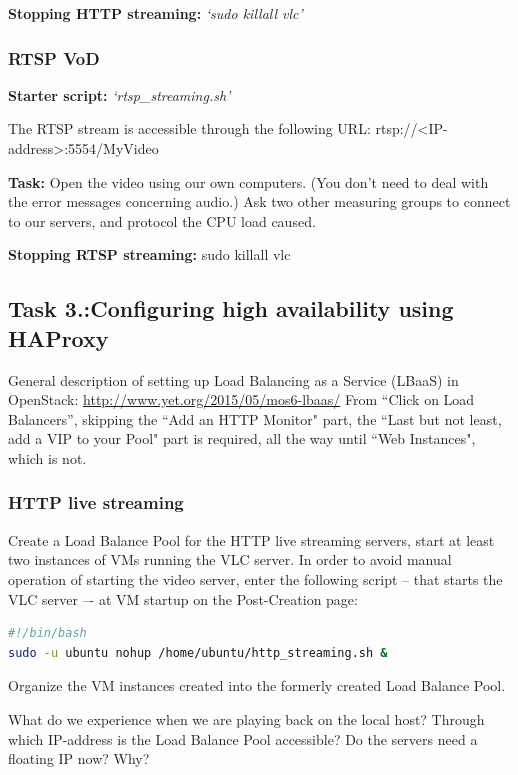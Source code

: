\documentclass[a4paper]{article}
\begin{document}
\noindent{}\textbf{Stopping HTTP streaming:} \emph{`sudo killall vlc'}

\subsubsection{RTSP VoD}
\textbf{Starter script:}  \emph{`rtsp\_streaming.sh'}

\noindent{}The RTSP stream is accessible through the following URL: rtsp://{}\textless{}IP-address{}\textgreater{}:5554/MyVideo

\noindent{}\textbf{Task:} Open the video using our own computers. (You don't need to deal with the error messages concerning audio.)
Ask two other measuring groups to connect to our servers, and protocol the CPU load caused.

\noindent{}\textbf{Stopping RTSP streaming:} sudo killall vlc

\subsection{Task 3.:Configuring high availability using HAProxy}

General description of setting up Load Balancing as a Service (LBaaS) in OpenStack:
\url{http://www.yet.org/2015/05/mos6-lbaas/}
From “Click on Load Balancers”, skipping the ``Add an HTTP Monitor" part, the ``Last but not least, add a VIP to your Pool" part is required, all the way until ``Web Instances", which is not.

\subsubsection{HTTP live streaming}

Create a Load Balance Pool for the HTTP live streaming servers, start at least two instances of VMs running the VLC server. In order to avoid manual operation of starting the video server, enter the following script -- that starts the VLC server –- at VM startup on the Post-Creation page:
\begin{lstlisting}[language=bash,breaklines]
#!/bin/bash
sudo -u ubuntu nohup /home/ubuntu/http_streaming.sh &
\end{lstlisting}

Organize the VM instances created into the formerly created Load Balance Pool. 

\noindent{}What do we experience when we are playing back on the local host? Through which IP-address is the Load Balance Pool accessible? Do the servers need a floating IP now? Why?
\end{document}
